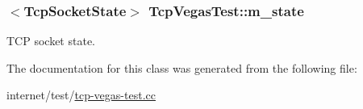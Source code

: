 \subsubsection[{\texorpdfstring{m\+\_\+state}{m_state}}]{$<${\bf Tcp\+Socket\+State}$>$ Tcp\+Vegas\+Test\+::m\+\_\+state\hspace{0.3cm}{\ttfamily [private]}}\hypertarget{classTcpVegasTest_a6007fa2677ef19ffe1bdb192900a86b3}{}\label{classTcpVegasTest_a6007fa2677ef19ffe1bdb192900a86b3}


T\+CP socket state. 



The documentation for this class was generated from the following file\+:\begin{DoxyCompactItemize}
\item 
internet/test/\hyperlink{tcp-vegas-test_8cc}{tcp-\/vegas-\/test.\+cc}\end{DoxyCompactItemize}

